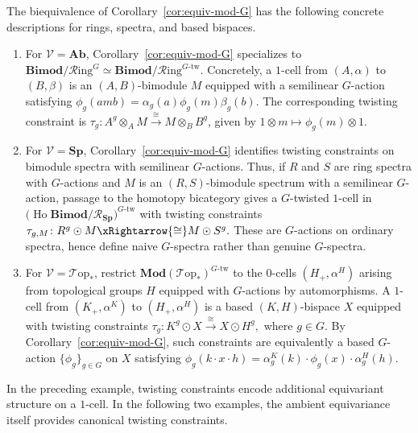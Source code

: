 \documentclass[11pt,oneside]{amsart}
\DeclareMathOperator{\Ho}{Ho}
\numberwithin{equation}{section}
\numberwithin{figure}{section}
\theoremstyle{plain}
\theoremstyle{definition}
\theoremstyle{remark}
\begin{document}
\begin{example}\label{ex:semilinear-G-twists}
The biequivalence of Corollary~\ref{cor:equiv-mod-G} has the following
concrete descriptions for rings, spectra, and based bispaces.
\begin{enumerate}
\item\label{case:ring-bimod}
For \(\mathcal V=\mathbf{Ab}\), Corollary~\ref{cor:equiv-mod-G}
specializes to
\(
\mathbf{Bimod}/\mathcal R\mathrm{ing}^G
\simeq
\mathbf{Bimod}/\mathcal R\mathrm{ing}^{G\text{-tw}}.
\) Concretely, a \(1\)-cell from \((A,\alpha)\) to \((B,\beta)\) is an \((A,B)\)-bimodule \(M\) equipped with a semilinear \(G\)-action satisfying \(\phi_g(amb) = \alpha_g(a)\phi_g(m)\beta_g(b)\). The corresponding twisting constraint is \(\tau_{g}\colon A^g\otimes_A M \xrightarrow{\cong} M\otimes_B B^g\), given by \(1\otimes m\mapsto \phi_g(m)\otimes 1\).


\item\label{case:borel-twisted-bimodules}
For \(\mathcal V=\mathbf{Sp}\),
Corollary~\ref{cor:equiv-mod-G} identifies  twisting
constraints on bimodule spectra with semilinear \(G\)-actions.
Thus, if \(R\) and \(S\) are ring spectra with \(G\)-actions and
\(M\) is an \((R,S)\)-bimodule spectrum with a semilinear
\(G\)-action, passage to the homotopy bicategory gives a
\(G\)-twisted \(1\)-cell in
\(
\bigl(\Ho\mathbf{Bimod}/\mathcal R_{\mathbf{Sp}}\bigr)^{G\text{-tw}}
\)
with twisting constraints
\(
\tau_{g,M}\colon
R^g\odot M
\xRightarrow{\cong}
M\odot S^g.
\)
These are \(G\)-actions on ordinary spectra, hence define naive
\(G\)-spectra rather than genuine \(G\)-spectra.
\item\label{case:twisted-bispaces}
For \(\mathcal V=\mathcal T\mathrm{op}_*\), restrict
\(\mathbf{Mod}(\mathcal T\mathrm{op}_*)^{G\text{-tw}}\) to the
\(0\)-cells \((H_+,\alpha^H)\) arising from topological groups \(H\)
equipped with \(G\)-actions by automorphisms. A \(1\)-cell from
\((K_+,\alpha^K)\) to \((H_+,\alpha^H)\) is a based
\((K,H)\)-bispace \(X\) equipped with twisting constraints
\(
\tau_{g}\colon
K^g\odot X
\xrightarrow{\cong}
X\odot H^g,\) where \(g\in G.
\)
By Corollary~\ref{cor:equiv-mod-G}, such constraints are equivalently
a based \(G\)-action \(\{\phi_g\}_{g\in G}\) on \(X\) satisfying
\(
\phi_g(k\cdot x\cdot h)
=
\alpha_g^K(k)\cdot\phi_g(x)\cdot\alpha_g^H(h).
\)
\end{enumerate}
\end{example}
 

In the preceding example, twisting constraints encode additional
equivariant structure on a \(1\)-cell. In the following two examples,
the ambient equivariance itself provides canonical twisting
constraints.
\end{document}
